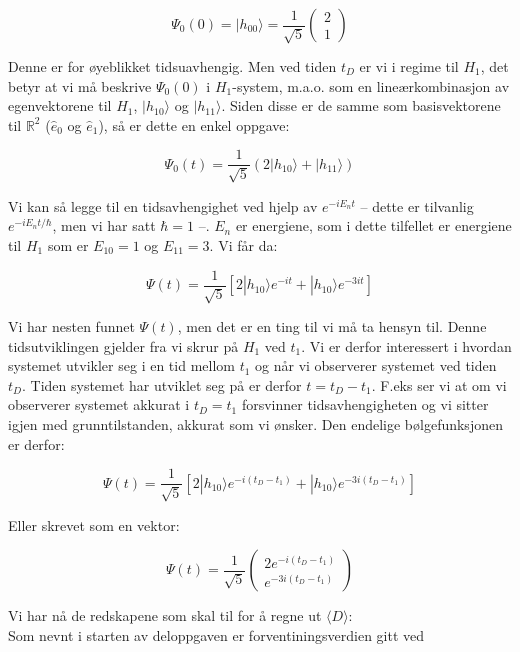 \documentclass[a4paper,norsk, 10pt]{article}
\numberwithin{equation}{section}
\begin{document}
$$
\Psi_0(0) = |h_{00}\rangle = \frac{1}{\sqrt{5}}
\begin{pmatrix}
2\\1
\end{pmatrix}
$$

Denne er for øyeblikket tidsuavhengig. Men ved tiden $t_D$ er vi i regime til $H_1$, det betyr at vi må beskrive $\Psi_0(0)$ i $H_1$-system, m.a.o. som en lineærkombinasjon av egenvektorene til $H_1$, $|h_{10}\rangle$ og $|h_{11}\rangle$. Siden disse er de samme som basisvektorene til $\mathbb{R}^2$ ($\hat{e}_0$ og $\hat{e}_1$), så er dette en enkel oppgave:

$$
\Psi_0(t) = \frac{1}{\sqrt{5}}(2|h_{10}\rangle + |h_{11}\rangle)
$$

Vi kan så legge til en tidsavhengighet ved hjelp av $e^{-iE_nt}$ -- dette er tilvanlig $e^{-iE_nt/\hbar}$, men vi har satt $\hbar = 1$ --. $E_n$ er energiene, som i dette tilfellet er energiene til $H_1$ som er $E_{10} = 1$ og $E_{11} = 3$. Vi får da:

$$
\Psi(t) = \frac{1}{\sqrt{5}}\left[2|h_{10}\rangle e^{-it} + |h_{10}\rangle e^{-3it}\right]
$$

Vi har nesten funnet $\Psi(t)$, men det er en ting til vi må ta hensyn til. Denne tidsutviklingen gjelder fra vi skrur på $H_1$ ved $t_1$. Vi er derfor interessert i hvordan systemet utvikler seg i en tid mellom $t_1$ og når vi observerer systemet ved tiden $t_D$. Tiden systemet har utviklet seg på er derfor $t = t_D - t_1$. F.eks ser vi at om vi observerer systemet akkurat i $t_D = t_1$ forsvinner tidsavhengigheten og vi sitter igjen med grunntilstanden, akkurat som vi ønsker. Den endelige bølgefunksjonen er derfor:

\begin{equation}
\Psi(t) = \frac{1}{\sqrt{5}}\left[2|h_{10}\rangle e^{-i(t_D - t_1)} + |h_{10}\rangle e^{-3i(t_D - t_1)}\right]
\label{eq:Psi(t)}
\end{equation}

Eller skrevet som en vektor:

$$
\Psi(t) = \frac{1}{\sqrt{5}}
\begin{pmatrix}
2e^{-i(t_D - t_1)}\\
e^{-3i(t_D - t_1)}
\end{pmatrix}
$$

Vi har nå de redskapene som skal til for å regne ut $\langle D \rangle$:\\

Som nevnt i starten av deloppgaven er forventiningsverdien gitt ved
\end{document}
